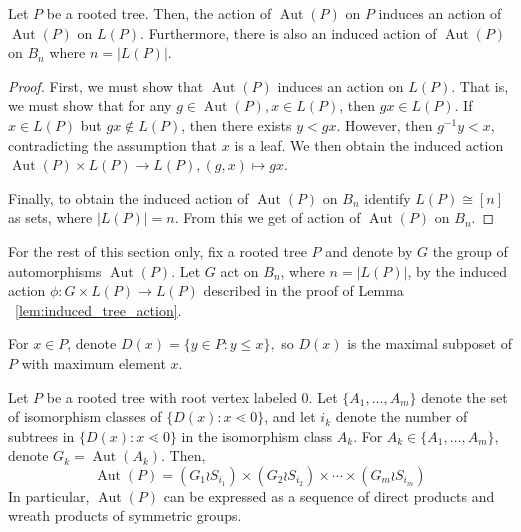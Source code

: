 \documentclass[smallextended]{svjour3}       %
\numberwithin{equation}{section}
\newcommand\Aut{\operatorname{Aut}}
\begin{document}
\begin{lemma}
\label{lem:induced_tree_action}
Let $P$ be a rooted tree. Then, the action of $\Aut(P)$ on $P$ induces an action of $\Aut(P)$ on $L(P)$. Furthermore, there is also an induced action of $\Aut(P)$ on $B_n$ where $n = |L(P)|$. 
\end{lemma}
\begin{proof}
First, we must show that $\Aut(P)$ induces an action on $L(P)$. That is, we must show that for any $g \in \Aut(P),x \in L(P)$, then $gx \in L(P)$. If $x \in L(P)$ but $gx \notin L(P)$, then there exists $y < gx$. However, then $g^{-1}y < x$, contradicting the assumption that $x$ is a leaf. We then obtain the induced action $\Aut(P)\times L(P) \rightarrow L(P),(g,x)\mapsto gx$.

Finally, to obtain the induced action of $\Aut(P)$ on $B_n$ identify $L(P) \cong [n]$ as sets, where $|L(P)| = n$. From this we get of action of $\Aut(P)$ on $B_n$.
\end{proof}

For the rest of this section only, fix a rooted tree $P$ and denote by $G$ the group of automorphisms $\Aut(P)$. Let $G$ act on $B_n$, where $n = |L(P)|$, by the induced action $\phi\colon G \times L(P) \rightarrow L(P)$ described in the proof of Lemma ~\ref{lem:induced_tree_action}.

For $x \in P$, denote $D(x) = \{y \in P\colon y \leq x\},$ so $D(x)$ is the maximal subposet of $P$ with maximum element $x$.

\begin{proposition}
\label{prop:automorphism_trees}
Let $P$ be a rooted tree with root vertex labeled $0$. Let $\{A_1,\ldots,A_m\}$ denote the set of isomorphism classes of $\{D(x)\colon x\lessdot 0\}$, and let $i_k$ denote the number of subtrees in $\{D(x)\colon x\lessdot 0\}$ in the isomorphism class $A_k$. For $A_k \in \{A_1,\ldots,A_m\}$, denote $G_k = \Aut(A_k)$. Then, 
\begin{equation}
\label{eq:level_expansion}
\Aut(P) = (G_1 \wr S_{i_1}) \times (G_2 \wr S_{i_2}) \times \cdots \times (G_m\wr S_{i_m})
\end{equation}
In particular, $\Aut(P)$ can be expressed as a sequence of direct products and wreath products of symmetric groups.
\end{proposition}
\end{document}
